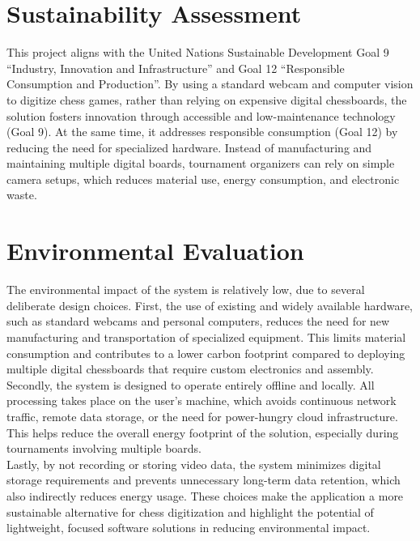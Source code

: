 \section{Sustainability Assessment}
This project aligns with the United Nations Sustainable Development Goal 9 “Industry, Innovation and Infrastructure” and Goal 12 “Responsible Consumption and Production”. By using a standard webcam and computer vision to digitize chess games, rather than relying on expensive digital chessboards, the solution fosters innovation through accessible and low-maintenance technology (Goal 9). At the same time, it addresses responsible consumption (Goal 12) by reducing the need for specialized hardware. Instead of manufacturing and maintaining multiple digital boards, tournament organizers can rely on simple camera setups, which reduces material use, energy consumption, and electronic waste.

\newpage

\section{Environmental Evaluation}
The environmental impact of the system is relatively low, due to several deliberate design choices. First, the use of existing and widely available hardware, such as standard webcams and personal computers, reduces the need for new manufacturing and transportation of specialized equipment. This limits material consumption and contributes to a lower carbon footprint compared to deploying multiple digital chessboards that require custom electronics and assembly. \\

Secondly, the system is designed to operate entirely offline and locally. All processing takes place on the user's machine, which avoids continuous network traffic, remote data storage, or the need for power-hungry cloud infrastructure. This helps reduce the overall energy footprint of the solution, especially during tournaments involving multiple boards. \\

Lastly, by not recording or storing video data, the system minimizes digital storage requirements and prevents unnecessary long-term data retention, which also indirectly reduces energy usage. These choices make the application a more sustainable alternative for chess digitization and highlight the potential of lightweight, focused software solutions in reducing environmental impact.

